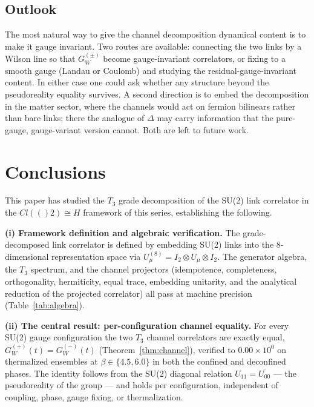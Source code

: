 \documentclass[12pt,a4paper]{article}
\newcommand{\Cl}{\mathrm{Cl}}
\newcommand{\HH}{\mathbb{H}}
\newcommand{\Id}[1]{I_{#1}}
\newcommand{\GW}[1]{G_W^{(#1)}}
\def\Cl#1{Cl(#1)}%
\def\HH{H}%
\def\mathbb#1{#1}%
\def\mathrm#1{#1}%
\begin{document}
	\subsection{Outlook}
	
	The most natural way to give the channel decomposition dynamical content is to make
	it gauge invariant. Two routes are available: connecting the two links by a Wilson
	line so that $\GW{\pm}$ become gauge-invariant correlators, or fixing to a smooth
	gauge (Landau or Coulomb) and studying the residual-gauge-invariant content. In
	either case one could ask whether any structure beyond the pseudoreality equality
	survives. A second direction is to embed the decomposition in the matter sector,
	where the channels would act on fermion bilinears rather than bare links; there the
	analogue of $\Delta$ may carry information that the pure-gauge, gauge-variant version
	cannot. Both are left to future work.
	
	\section{Conclusions}
	
	This paper has studied the $T_3$ grade decomposition of the SU(2) link correlator in
	the $\Cl(2)\cong\HH$ framework of this series, establishing the following.
	
	\textbf{(i) Framework definition and algebraic verification.}  The grade-decomposed
	link correlator is defined by embedding SU(2) links into the 8-dimensional
	representation space via $U_\mu^{(8)}=\Id{2}\otimes U_\mu\otimes\Id{2}$.  The
	generator algebra, the $T_3$ spectrum, and the channel projectors (idempotence,
	completeness, orthogonality, hermiticity, equal trace, embedding unitarity, and the
	analytical reduction of the projected correlator) all pass at machine precision
	(Table~\ref{tab:algebra}).
	
	\textbf{(ii) The central result: per-configuration channel equality.}  For every
	SU(2) gauge configuration the two $T_3$ channel correlators are exactly equal,
	$\GW{+}(t)=\GW{-}(t)$ (Theorem~\ref{thm:channel}), verified to $0.00\times10^0$ on
	thermalized ensembles at $\beta\in\{4.5,6.0\}$ in both the confined and deconfined
	phases.  The identity follows from the SU(2) diagonal relation
	$U_{11}=\overline{U_{00}}$ --- the pseudoreality of the group --- and holds per
	configuration, independent of coupling, phase, gauge fixing, or thermalization.
	
\end{document}
